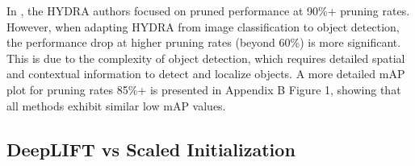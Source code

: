 \documentclass[10pt]{cai}
\begin{document}
In \cite{hydra}, the HYDRA authors focused on pruned performance at 90\%+ pruning rates. However, when adapting HYDRA from image classification to object detection, the performance drop at higher pruning rates (beyond 60\%) is more significant. This is due to the complexity of object detection, which requires detailed spatial and contextual information to detect and localize objects. A more detailed mAP plot for pruning rates 85\%+ is presented in Appendix B Figure 1, showing that all methods exhibit similar low mAP values.

\subsection{DeepLIFT vs Scaled Initialization}
\label{sec1}
\end{document}
